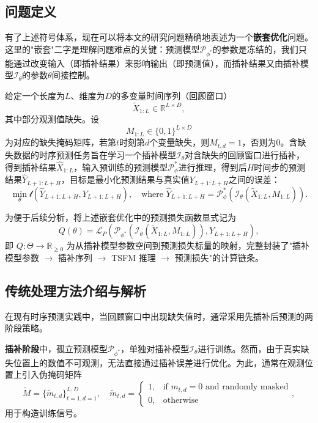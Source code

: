 \documentclass{article}
\begin{document}
\subsection{问题定义}

有了上述符号体系，现在可以将本文的研究问题精确地表述为一个\textbf{嵌套优化}问题。这里的"嵌套"二字是理解问题难点的关键：预测模型$\mathcal{P}_{\phi^\ast}$的参数是冻结的，我们只能通过改变输入（即插补结果）来影响输出（即预测值），而插补结果又由插补模型$\mathcal{I}_\theta$的参数$\theta$间接控制。

给定一个长度为$L$、维度为$D$的多变量时间序列（回顾窗口）
\begin{equation}
	\tilde{X}_{1:L}\in\mathbb{R}^{L\times D},
\end{equation}
其中部分观测值缺失。设
\begin{equation}
	M_{1:L}\in\{0,1\}^{L\times D}
\end{equation}
为对应的缺失掩码矩阵，若第$t$时刻第$d$个变量缺失，则$M_{t,d}=1$，否则为$0$。含缺失数据的时序预测任务旨在学习一个插补模型$\mathcal{I}_\theta$对含缺失的回顾窗口进行插补，得到插补结果${\hat{X}}_{1:L}$，输入预训练的预测模型$\mathcal{P}_\phi^\ast$进行推理，得到后$H$时间步的预测结果$\hat{Y}_{L+1:L+H}$，目标是最小化预测结果与真实值$Y_{L+1:L+H}$之间的误差：
\begin{equation}
	\min_{\theta}\mathcal{l}(\hat{Y}_{L+1:L+H}, Y_{L+1:L+H}),\quad\text{where }\hat{Y}_{L+1:L+H} =\mathcal{P}_\phi^\ast(\mathcal{I}_\theta(\tilde{X}_{1:L}, M_{1:L})).
\end{equation}

为便于后续分析，将上述嵌套优化中的预测损失函数显式记为
\begin{equation}\label{eq:Q_def}
	Q(\theta) = \mathcal{L}_P(\mathcal{P}_{\phi^\ast}(\mathcal{I}_\theta(\tilde{X}_{1:L}, M_{1:L})), Y_{L+1:L+H}),
\end{equation}
即 $Q: \Theta \to \mathbb{R}_{\geq 0}$ 为从插补模型参数空间到预测损失标量的映射，完整封装了"插补模型参数 $\to$ 插补序列 $\to$ TSFM 推理 $\to$ 预测损失"的计算链条。

\subsection{传统处理方法介绍与解析}

在现有时序预测实践中，当回顾窗口中出现缺失值时，通常采用先插补后预测的两阶段策略。

\textbf{插补阶段}中，孤立预测模型$\mathcal{P}_{\phi^\ast}$，单独对插补模型$\mathcal{I}_\theta$进行训练。然而，由于真实缺失位置上的数值不可观测，无法直接通过插补误差进行优化。为此，通常在观测位置上引入伪掩码矩阵
\begin{equation}
	\tilde{M} =\{\tilde{m}_{t,d}\}_{t=1,d=1}^{L,D},\quad\tilde{m}_{t,d} =\begin{cases}1, &\text{if } m_{t,d}=0\text{ and }\text{randomly masked}\\0, &\text{otherwise}\end{cases},
\end{equation}
用于构造训练信号。
\end{document}
